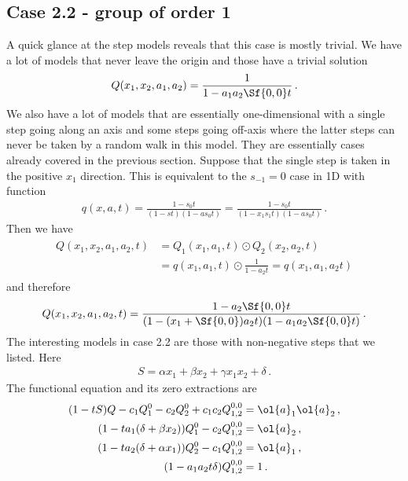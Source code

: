 \subsection{Case 2.2 - group of order 1}
A quick glance at the step models reveals that this case is mostly trivial. We have a lot of models that never leave the origin and those have a trivial solution
\begin{align}
	Q(x_1,x_2,a_1,a_2) = \frac{1}{1-a_1a_2 \Sf{0,0} t}\,.
\end{align}
We also have a lot of models that are essentially one-dimensional with a single step going along an axis and some steps going off-axis where the latter steps can never be taken by a random walk in this model. They are essentially cases already covered in the previous section. Suppose that the single step is taken in the positive $x_1$ direction. This is equivalent to the $s_{-1} = 0$ case in 1D with function
\begin{align}
	q(x,a,t) = \frac{1-s_0 t}{(1-st)(1-a s_0 t)} = \frac{1-s_0 t}{(1-x_1s_1 t)(1-a s_0 t)}\,.
\end{align}
Then we have
\begin{align}\begin{split}
	Q(x_1,x_2,a_1,a_2,t) &= Q_1(x_1,a_1,t) \odot Q_2(x_2,a_2,t) \\
	&=  q(x_1,a_1,t) \odot \frac{1}{1-a_2 t}= q(x_1,a_1,a_2 t)
\end{split}\end{align}
and therefore
\begin{align}
	Q(x_1,x_2,a_1,a_2,t) = \frac{1-a_2 \Sf{0,0} t}{(1-(x_1+\Sf{0,0})a_2 t)(1-a_1a_2 \Sf{0,0}t)}\,.
\end{align}
The interesting models in case 2.2 are those with non-negative steps that we listed. Here
\begin{align}
	S = \alpha x_1 + \beta x_2 + \gamma x_1 x_2 + \delta\,.
\end{align}
The functional equation and its zero extractions are
\begin{align}\begin{split}
(1-tS)Q - c_1 Q_1^0- c_2 Q_2^0+ c_1c_2 Q_{1,2}^{0,0}  &= \ol{a}_1\ol{a}_2\,,\\
(1-ta_1 (\delta+\beta x_2))Q_1^0 - c_2Q_{1,2}^{0,0} &=\ol{a}_2\,,\\
(1-ta_2 (\delta+\alpha x_1))Q_2^0 - c_1Q_{1,2}^{0,0}  &=\ol{a}_1\,,\\
(1-a_1 a_2 t \delta)Q_{1,2}^{0,0} &= 1\,.
\end{split}\end{align}
